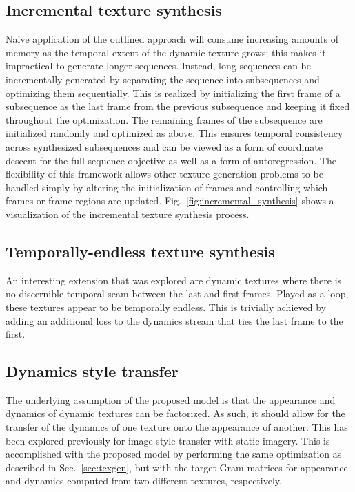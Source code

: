 \subsection{Incremental texture synthesis}\label{sec:incremental_synthesis}

Naive application of the outlined approach will consume
increasing amounts of memory as the temporal extent of the 
dynamic texture grows; this makes it impractical to generate
longer sequences.
Instead, long sequences can be incrementally generated by
separating the sequence into subsequences and optimizing them 
sequentially. This is realized by initializing the first frame of a subsequence as the last 
frame from the previous subsequence and keeping it fixed throughout
the optimization.
The remaining frames of the subsequence are initialized randomly and
optimized as above.
This ensures temporal consistency across synthesized subsequences
and can be viewed as a form of coordinate descent for the full
sequence objective as well as a form of autoregression.
The flexibility of this framework allows other texture generation
problems to be handled simply by altering the 
initialization of frames and controlling which
frames or frame regions are updated. Fig.\ \ref{fig:incremental_synthesis}
shows a visualization of the incremental texture synthesis process.



\subsection{Temporally-endless texture synthesis}\label{sec:temporally_endless_synthesis}

An interesting extension that was explored are dynamic textures where there is no discernible temporal seam between the last and first frames. Played as a loop, these textures appear to be temporally endless. This is trivially achieved by adding an additional loss to the dynamics stream that ties the last frame to the first. 

\subsection{Dynamics style transfer}

The underlying assumption of the proposed model is that the appearance
and dynamics of dynamic textures can be factorized.
As such, it should allow for the transfer of the dynamics of
one texture onto the appearance of another.
This has been explored previously for image style transfer
\cite{champandard2016,gatys2017} with static imagery.
This is accomplished with the proposed model by performing the same 
optimization as described in Sec.\ \ref{sec:texgen}, but with the target Gram matrices for 
appearance and dynamics computed from two different textures, respectively. 